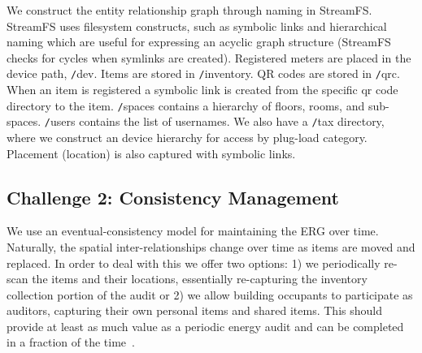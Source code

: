 We construct the entity relationship graph through naming in StreamFS.  StreamFS uses filesystem constructs, such as symbolic
links and hierarchical naming which are useful for expressing an acyclic graph structure (StreamFS checks for cycles when symlinks 
are created).  
Registered meters are placed in the device path, {\texttt /dev}.  Items are stored in {\texttt /inventory}.  QR codes are stored 
in {\texttt /qrc}.  When an item is registered a 
symbolic link is created from the specific qr code directory to the item.  {\texttt /spaces} contains a hierarchy of floors, rooms, 
and sub-spaces.  {\texttt /users} contains the list of usernames.  We also have a {\texttt /tax} directory, where we construct an
device hierarchy for access by plug-load category.  Placement (location) is also captured with symbolic links. 

\subsection{Challenge 2: Consistency Management}
We use an eventual-consistency model for maintaining the ERG over time.  Naturally, the spatial inter-relationships
change over time as items are moved and replaced.  In order to deal with this we offer two options: 1) we periodically
re-scan the items and their locations, essentially re-capturing the inventory collection portion of the audit or
2) we allow building occupants to participate as auditors, capturing their own personal items and shared items.
This should provide at least as much value as a periodic energy audit and can be completed in a fraction of the 
time~\cite{aceee_mobileaudit}.



